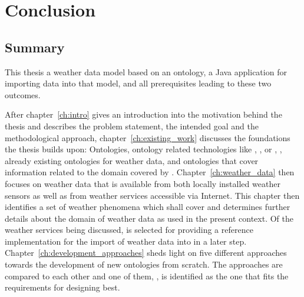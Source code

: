 \chapter{Conclusion}
\label{ch:conclusion}



\section{Summary}

This thesis a weather data model based on an  ontology, a Java application for importing data into that model, and all prerequisites leading to these two outcomes.

After chapter~\ref{ch:intro} gives an introduction into the motivation behind the thesis and describes the problem statement, the intended goal and the methodological approach, chapter~\ref{ch:existing_work} discusses the foundations the thesis builds upon: Ontologies, ontology related technologies like , , or , \thinkhome, already existing ontologies for weather data, and ontologies that cover information related to the domain covered by \smarthomeweather. Chapter~\ref{ch:weather_data} then focuses on weather data that is available from both locally installed weather sensors as well as from weather services accessible via Internet. This chapter then identifies a set of weather phenomena which \smarthomeweather shall cover and determines further details about the domain of weather data as used in the present context.
Of the weather services being discussed, \yrno is selected for providing a reference implementation for the import of weather data into \smarthomeweather in a later step. Chapter~\ref{ch:development_approaches} sheds light on five different approaches towards the development of new ontologies from scratch. The approaches are compared to each other and one of them, \methontology, is identified as the one that fits the requirements for designing \smarthomeweather best.


